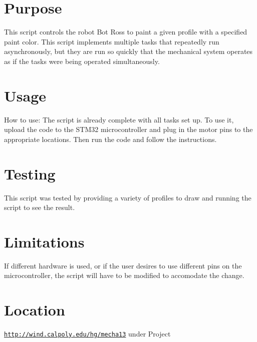 \hypertarget{index_Purpose}{}\section{Purpose}\label{index_Purpose}
This script controls the robot Bot Ross to paint a given profile with a specified paint color. This script implements multiple tasks that repeatedly run asynchronously, but they are run so quickly that the mechanical system operates as if the tasks were being operated simultaneously. \hypertarget{index_Usage}{}\section{Usage}\label{index_Usage}
How to use\+: The script is already complete with all tasks set up. To use it, upload the code to the S\+T\+M32 microcontroller and plug in the motor pins to the appropriate locations. Then run the code and follow the instructions. \hypertarget{index_Testing}{}\section{Testing}\label{index_Testing}
This script was tested by providing a variety of profiles to draw and running the script to see the result. \hypertarget{index_Limitations}{}\section{Limitations}\label{index_Limitations}
If different hardware is used, or if the user desires to use different pins on the microcontroller, the script will have to be modified to accomodate the change. \hypertarget{index_Location}{}\section{Location}\label{index_Location}
\href{http://wind.calpoly.edu/hg/mecha13}{\tt http\+://wind.\+calpoly.\+edu/hg/mecha13} under Project 